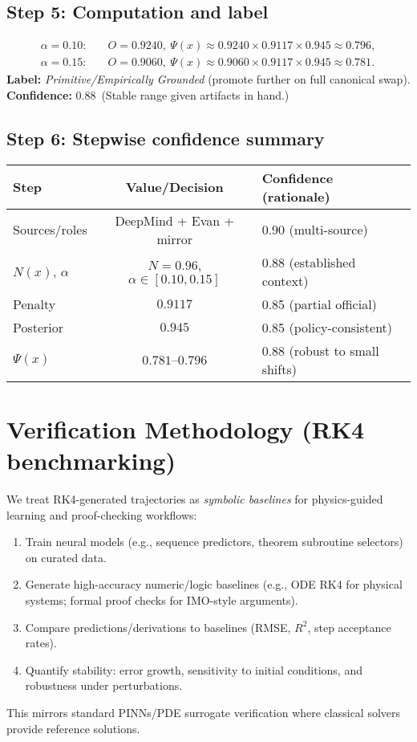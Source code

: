 \documentclass[11pt]{article}
\newcommand{\Px}{\Psi(x)}
\newcommand{\conf}[2]{\textbf{Confidence:} #1\ (#2)}
\begin{document}
\subsection*{Step 5: Computation and label}
\begin{align*}
\alpha=0.10:&\quad O=0.9240,\ \Px \approx 0.9240\times 0.9117\times 0.945 \approx 0.796,\\
\alpha=0.15:&\quad O=0.9060,\ \Px \approx 0.9060\times 0.9117\times 0.945 \approx 0.781.
\end{align*}
\textbf{Label:} \emph{Primitive/Empirically Grounded} (promote further on full canonical swap).\\
\conf{0.88}{Stable range given artifacts in hand.}

\subsection*{Step 6: Stepwise confidence summary}
\begin{center}
\renewcommand{\arraystretch}{1.15}
\begin{tabular}{@{}lcl@{}}
\toprule
Step & Value/Decision & Confidence (rationale)\\
\midrule
Sources/roles & DeepMind + Evan + mirror & 0.90 (multi-source)\\
$N(x)$, $\alpha$ & $N=0.96$, $\alpha\in[0.10,0.15]$ & 0.88 (established context)\\
Penalty & $0.9117$ & 0.85 (partial official)\\
Posterior & $0.945$ & 0.85 (policy-consistent)\\
$\Px$ & $0.781$--$0.796$ & 0.88 (robust to small shifts)\\
\bottomrule
\end{tabular}
\end{center}

\section{Verification Methodology (RK4 benchmarking)}
We treat RK4-generated trajectories as \emph{symbolic baselines} for physics-guided learning and proof-checking workflows:
\begin{enumerate}[leftmargin=1.35em]
  \item Train neural models (e.g., sequence predictors, theorem subroutine selectors) on curated data.
  \item Generate high-accuracy numeric/logic baselines (e.g., ODE RK4 for physical systems; formal proof checks for IMO-style arguments).
  \item Compare predictions/derivations to baselines (RMSE, $R^2$, step acceptance rates).
  \item Quantify stability: error growth, sensitivity to initial conditions, and robustness under perturbations.
\end{enumerate}
This mirrors standard PINNs/PDE surrogate verification where classical solvers provide reference solutions.
\end{document}
